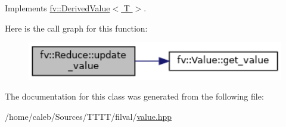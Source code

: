 Implements \hyperlink{classfv_1_1DerivedValue_ae59e80a98eb74b95d8961bfe12ee5ec2}{fv\+::\+Derived\+Value$<$ T $>$}.

Here is the call graph for this function\+:
\nopagebreak
\begin{figure}[H]
\begin{center}
\leavevmode
\includegraphics[width=336pt]{classfv_1_1Reduce_ab0809c4ab1884b84a7f88e005ade76a5_cgraph}
\end{center}
\end{figure}


The documentation for this class was generated from the following file\+:\begin{DoxyCompactItemize}
\item 
/home/caleb/\+Sources/\+T\+T\+T\+T/filval/\hyperlink{value_8hpp}{value.\+hpp}\end{DoxyCompactItemize}
